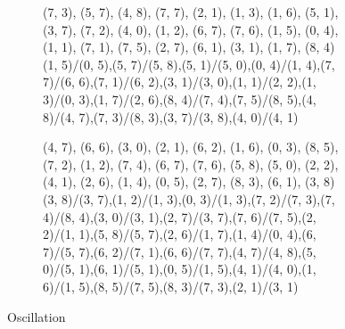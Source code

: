 \begin{figure}[h!]
  \centering
  \begin{subfigure}[b]{0.40\textwidth}
    \resizebox{\linewidth}{!} {
       {{(7, 3), (5, 7), (4, 8), (7, 7), (2, 1), (1, 3), (1, 6),
      (5, 1), (3, 7), (7, 2), (4, 0), (1, 2), (6, 7), (7, 6), (1, 5), (0, 4),
      (1, 1), (7, 1), (7, 5), (2, 7), (6, 1), (3, 1), (1, 7), (8, 4)}} {{{(1,
      5)/(0, 5)},{(5, 7)/(5, 8)},{(5, 1)/(5, 0)},{(0, 4)/(1, 4)},{(7, 7)/(6,
      6)},{(7, 1)/(6, 2)},{(3, 1)/(3, 0)},{(1, 1)/(2, 2)},{(1, 3)/(0, 3)},{(1,
      7)/(2, 6)},{(8, 4)/(7, 4)},{(7, 5)/(8, 5)},{(4, 8)/(4, 7)},{(7, 3)/(8,
      3)},{(3, 7)/(3, 8)},{(4, 0)/(4, 1)}}}
    }
  \end{subfigure}
  \begin{subfigure}[b]{0.40\textwidth}
    \resizebox{\linewidth}{!} {
       {{(4, 7), (6, 6), (3, 0), (2, 1), (6, 2), (1, 6), (0, 3),
      (8, 5), (7, 2), (1, 2), (7, 4), (6, 7), (7, 6), (5, 8), (5, 0), (2, 2),
      (4, 1), (2, 6), (1, 4), (0, 5), (2, 7), (8, 3), (6, 1), (3, 8)}} {{{(3,
      8)/(3, 7)},{(1, 2)/(1, 3)},{(0, 3)/(1, 3)},{(7, 2)/(7, 3)},{(7, 4)/(8,
      4)},{(3, 0)/(3, 1)},{(2, 7)/(3, 7)},{(7, 6)/(7, 5)},{(2, 2)/(1, 1)},{(5,
      8)/(5, 7)},{(2, 6)/(1, 7)},{(1, 4)/(0, 4)},{(6, 7)/(5, 7)},{(6, 2)/(7,
      1)},{(6, 6)/(7, 7)},{(4, 7)/(4, 8)},{(5, 0)/(5, 1)},{(6, 1)/(5, 1)},{(0,
      5)/(1, 5)},{(4, 1)/(4, 0)},{(1, 6)/(1, 5)},{(8, 5)/(7, 5)},{(8, 3)/(7,
      3)},{(2, 1)/(3, 1)}}}
    }
  \end{subfigure}
  \caption{Oscillation}
  \label{fig:oscillation}
\end{figure}
